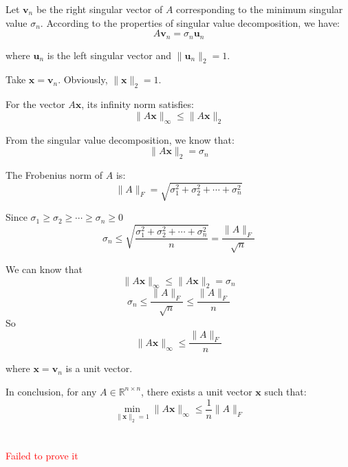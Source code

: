 \documentclass{article}
\begin{document}
Let $ \mathbf{v}_n $ be the right singular vector of $ A $ corresponding to the minimum singular value $ \sigma_n $. According to the properties of singular value decomposition, we have:
$$
A\mathbf{v}_n = \sigma_n \mathbf{u}_n
$$

where $ \mathbf{u}_n $ is the left singular vector and $ \|\mathbf{u}_n\|_2 = 1 $.

Take $ \mathbf{x} = \mathbf{v}_n $. Obviously, $ \|\mathbf{x}\|_2 = 1 $.

For the vector $ A\mathbf{x} $, its infinity norm satisfies:
$$
\|A\mathbf{x}\|_\infty \leq \|A\mathbf{x}\|_2
$$

From the singular value decomposition, we know that:
$$
\|A\mathbf{x}\|_2 = \sigma_n
$$
  
The Frobenius norm of $ A $ is:
$$
\|A\|_F = \sqrt{\sigma_1^2 + \sigma_2^2 + \cdots + \sigma_n^2}
$$

Since $ \sigma_1 \geq \sigma_2 \geq \cdots \geq \sigma_n \geq 0 $
$$
\sigma_n \leq \sqrt{\frac{\sigma_1^2 + \sigma_2^2 + \cdots + \sigma_n^2}{n}} = \frac{\|A\|_F}{\sqrt{n}}
$$

We can know that
$$
\|A\mathbf{x}\|_\infty \leq \|A\mathbf{x}\|_2 = \sigma_n
$$
$$
\sigma_n \leq \frac{\|A\|_F}{\sqrt{n}} \leq \frac{\|A\|_F}{n}
$$
So
$$
\|A\mathbf{x}\|_\infty \leq \frac{\|A\|_F}{n}
$$

where $ \mathbf{x} = \mathbf{v}_n $ is a unit vector.

In conclusion, for any $ A \in \mathbb{R}^{n \times n} $, there exists a unit vector $ \mathbf{x} $ such that:
$$
\min_{\|\mathbf{x}\|_2 = 1} \|A\mathbf{x}\|_\infty \leq \frac{1}{n}\|A\|_F
$$

\section{}

\textcolor{red}{Failed to prove it}
\end{document}

